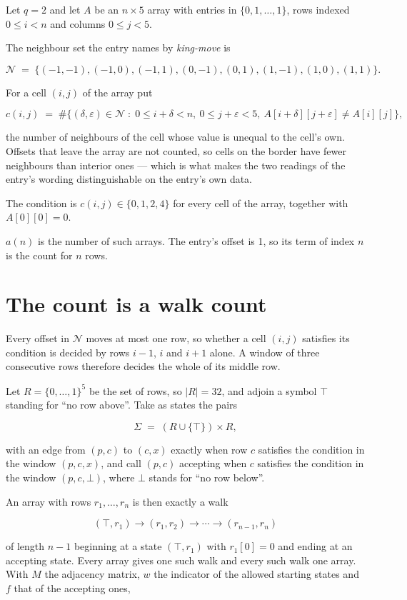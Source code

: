 \documentclass[11pt]{article}
\theoremstyle{definition}
\begin{document}
Let $q = 2$ and let $A$ be an $n \times 5$ array with entries in $\{0,1,\dots,1\}$, rows indexed $0 \le i < n$ and columns $0 \le j < 5$.

The neighbour set the entry names by {\itshape king-move} is

\[\mathcal{N} \;=\; \{(-1,-1), (-1,0), (-1,1), (0,-1), (0,1), (1,-1), (1,0), (1,1)\}.\]

For a cell $(i,j)$ of the array put

\[c(i,j) \;=\; \#\bigl\{(\delta,\varepsilon)\in\mathcal{N} \;:\; 0\le i+\delta<n,\ 0\le j+\varepsilon<5,\ A[i+\delta][j+\varepsilon] \neq A[i][j]\bigr\},\]

the number of neighbours of the cell whose value is unequal to the cell's own. Offsets that leave the array are not counted, so cells on the border have fewer neighbours than interior ones --- which is what makes the two readings of the entry's wording distinguishable on the entry's own data.

The condition is $c(i,j) \in \{0, 1, 2, 4\}$ for every cell of the array, together with $A[0][0]=0$.

$a(n)$ is the number of such arrays. The entry's offset is 1, so its term of index $n$ is the count for $n$ rows.

\section{The count is a walk count}

Every offset in $\mathcal{N}$ moves at most one row, so whether a cell $(i,j)$ satisfies its condition is decided by rows $i-1$, $i$ and $i+1$ alone. A window of three consecutive rows therefore decides the whole of its middle row.

Let $R = \{0,\dots,1\}^{5}$ be the set of rows, so $|R| = 32$, and adjoin a symbol $\top$ standing for ``no row above''. Take as states the pairs

\[\Sigma \;=\; (R \cup \{\top\}) \times R,\]

with an edge from $(p,c)$ to $(c,x)$ exactly when row $c$ satisfies the condition in the window $(p,c,x)$, and call $(p,c)$ accepting when $c$ satisfies the condition in the window $(p,c,\bot)$, where $\bot$ stands for ``no row below''.

An array with rows $r_1,\dots,r_n$ is then exactly a walk

\[(\top,r_1) \to (r_1,r_2) \to \cdots \to (r_{n-1},r_n)\]

of length $n-1$ beginning at a state $(\top,r_1)$ with $r_1[0]=0$ and ending at an accepting state. Every array gives one such walk and every such walk one array. With $M$ the adjacency matrix, $w$ the indicator of the allowed starting states and $f$ that of the accepting ones,
\end{document}
